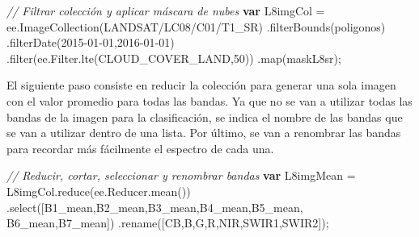 \documentclass[
  12pt,
  letterpaper,
  twoside]{book}
\newenvironment{Shaded}{\begin{snugshade}}{\end{snugshade}}
\newcommand{\AttributeTok}[1]{\textcolor[rgb]{0.48,0.12,0.64}{#1}}
\newcommand{\CommentTok}[1]{\textcolor[rgb]{0.24,0.58,0.00}{\textit{#1}}}
\newcommand{\DecValTok}[1]{\textcolor[rgb]{0.28,0.53,0.93}{#1}}
\newcommand{\FunctionTok}[1]{\textcolor[rgb]{0.48,0.12,0.64}{#1}}
\newcommand{\KeywordTok}[1]{\textcolor[rgb]{0.00,0.00,0.00}{\textbf{#1}}}
\newcommand{\NormalTok}[1]{#1}
\newcommand{\OperatorTok}[1]{\textcolor[rgb]{0.00,0.00,0.00}{#1}}
\newcommand{\StringTok}[1]{\textcolor[rgb]{0.87,0.29,0.22}{#1}}
\begin{document}
\begin{Shaded}
\begin{Highlighting}[]
\CommentTok{// Filtrar colección y aplicar máscara de nubes}
\KeywordTok{var}\NormalTok{ L8imgCol }\OperatorTok{=}\NormalTok{ ee}\OperatorTok{.}\FunctionTok{ImageCollection}\NormalTok{(}\StringTok{\textquotesingle{}LANDSAT/LC08/C01/T1\_SR\textquotesingle{}}\NormalTok{)}
  \OperatorTok{.}\FunctionTok{filterBounds}\NormalTok{(poligonos)}
  \OperatorTok{.}\FunctionTok{filterDate}\NormalTok{(}\StringTok{\textquotesingle{}2015{-}01{-}01\textquotesingle{}}\OperatorTok{,}\StringTok{\textquotesingle{}2016{-}01{-}01\textquotesingle{}}\NormalTok{)}
  \OperatorTok{.}\FunctionTok{filter}\NormalTok{(ee}\OperatorTok{.}\AttributeTok{Filter}\OperatorTok{.}\FunctionTok{lte}\NormalTok{(}\StringTok{\textquotesingle{}CLOUD\_COVER\_LAND\textquotesingle{}}\OperatorTok{,}\DecValTok{50}\NormalTok{))}
  \OperatorTok{.}\FunctionTok{map}\NormalTok{(maskL8sr)}\OperatorTok{;}
\end{Highlighting}
\end{Shaded}

El siguiente paso consiste en reducir la colección para generar una sola imagen con el valor promedio para todas las bandas. Ya que no se van a utilizar todas las bandas de la imagen para la clasificación, se indica el nombre de las bandas que se van a utilizar dentro de una lista. Por último, se van a renombrar las bandas para recordar más fácilmente el espectro de cada una.

\begin{Shaded}
\begin{Highlighting}[]
\CommentTok{// Reducir, cortar, seleccionar y renombrar bandas}
\KeywordTok{var}\NormalTok{ L8imgMean }\OperatorTok{=}\NormalTok{ L8imgCol}\OperatorTok{.}\FunctionTok{reduce}\NormalTok{(ee}\OperatorTok{.}\AttributeTok{Reducer}\OperatorTok{.}\FunctionTok{mean}\NormalTok{())}
  \OperatorTok{.}\FunctionTok{select}\NormalTok{([}\StringTok{\textquotesingle{}B1\_mean\textquotesingle{}}\OperatorTok{,}\StringTok{\textquotesingle{}B2\_mean\textquotesingle{}}\OperatorTok{,}\StringTok{\textquotesingle{}B3\_mean\textquotesingle{}}\OperatorTok{,}\StringTok{\textquotesingle{}B4\_mean\textquotesingle{}}\OperatorTok{,}\StringTok{\textquotesingle{}B5\_mean\textquotesingle{}}\OperatorTok{,}
  \StringTok{\textquotesingle{}B6\_mean\textquotesingle{}}\OperatorTok{,}\StringTok{\textquotesingle{}B7\_mean\textquotesingle{}}\NormalTok{])}
  \OperatorTok{.}\FunctionTok{rename}\NormalTok{([}\StringTok{\textquotesingle{}CB\textquotesingle{}}\OperatorTok{,}\StringTok{\textquotesingle{}B\textquotesingle{}}\OperatorTok{,}\StringTok{\textquotesingle{}G\textquotesingle{}}\OperatorTok{,}\StringTok{\textquotesingle{}R\textquotesingle{}}\OperatorTok{,}\StringTok{\textquotesingle{}NIR\textquotesingle{}}\OperatorTok{,}\StringTok{\textquotesingle{}SWIR1\textquotesingle{}}\OperatorTok{,}\StringTok{\textquotesingle{}SWIR2\textquotesingle{}}\NormalTok{])}\OperatorTok{;}
\end{Highlighting}
\end{Shaded}
\end{document}
